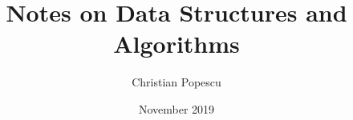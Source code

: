 \documentclass[a4paper,12pt]{book}
\begin{document}
\author{Christian Popescu}
\title{Notes on Data Structures and Algorithms}
\date{November 2019}

\frontmatter
\maketitle
\tableofcontents

\mainmatter






\backmatter
\end{document}
